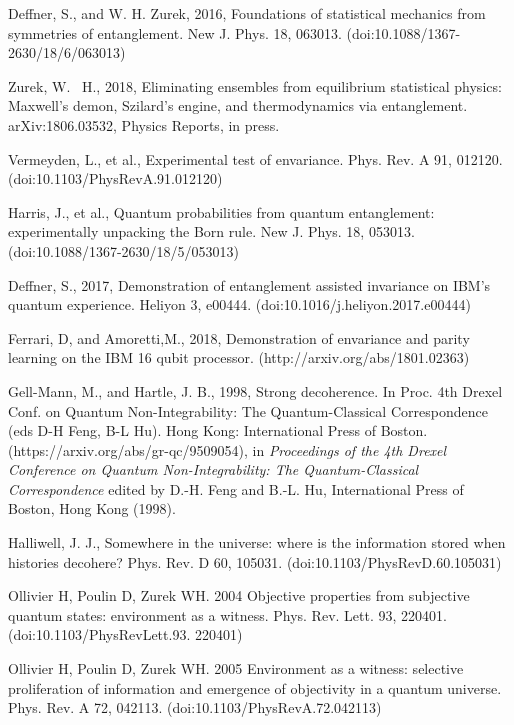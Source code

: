 \documentclass[aps,amsmath,amssymb,amsfonts,floatfix]{revtex4-1}
\newcommand{\+}         {\dagger}
\begin{document}
{{{\begin{references}
 Deffner, S., and W. H. Zurek, 2016, Foundations of statistical mechanics from symmetries of
entanglement. New J. Phys. 18, 063013. (doi:10.1088/1367-2630/18/6/063013)

 Zurek, W. ~H., 2018, Eliminating ensembles from equilibrium statistical physics: Maxwell's
demon, Szilard's engine, and thermodynamics via entanglement. arXiv:1806.03532, Physics Reports, in press.

 Vermeyden, L., et al., 
Experimental
test of envariance. Phys. Rev. A 91, 012120. (doi:10.1103/PhysRevA.91.012120)

 Harris, J.,  et al., 
Quantum
probabilities from quantum entanglement: experimentally unpacking the Born rule. New J.
Phys. 18, 053013. (doi:10.1088/1367-2630/18/5/053013)

 Deffner, S., 2017, Demonstration of entanglement assisted invariance on IBM's quantum
experience. Heliyon 3, e00444. (doi:10.1016/j.heliyon.2017.e00444)

 Ferrari, D, and Amoretti,M., 2018, Demonstration of envariance and parity learning on the IBM 16
qubit processor. (http://arxiv.org/abs/1801.02363)

 Gell-Mann, M., and Hartle, J. B., 1998, Strong decoherence. In Proc. 4th Drexel Conf. on Quantum
Non-Integrability: The Quantum-Classical Correspondence (eds D-H Feng, B-L Hu). Hong Kong:
International Press of Boston. (https://arxiv.org/abs/gr-qc/9509054), in {\it Proceedings of the 4th Drexel Conference on Quantum Non-Integrability: The Quantum-Classical Correspondence} edited by D.-H. Feng and B.-L. Hu, International Press of Boston, Hong Kong (1998).

 Halliwell, J. J., Somewhere in the universe: where is the information stored when histories
decohere? Phys. Rev. D 60, 105031. (doi:10.1103/PhysRevD.60.105031)

 Ollivier H, Poulin D, Zurek WH. 2004 Objective properties from subjective quantum
states: environment as a witness. Phys. Rev. Lett. 93, 220401. (doi:10.1103/PhysRevLett.93.
220401)

 Ollivier H, Poulin D, Zurek WH. 2005 Environment as a witness: selective proliferation of
information and emergence of objectivity in a quantum universe. Phys. Rev. A 72, 042113.
(doi:10.1103/PhysRevA.72.042113)


\end{references}}}}
\end{document}
